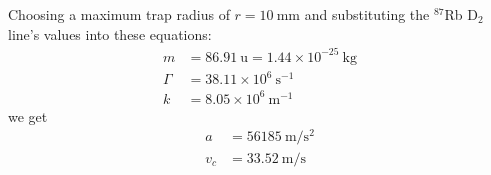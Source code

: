 \documentclass[12pt,a4paper]{article}
\begin{document}
Choosing a maximum trap radius of $r=10~\mathrm{mm}$ and substituting the $^{87}$Rb D$_2$ line's values into these equations:
\begin{align*}
m &= 86.91~\mathrm{u} = 1.44 \times 10^{-25}~\mathrm{kg} \\
\Gamma &= 38.11 \times 10^{6}~\mathrm{s}^{-1} \\
k &= 8.05 \times 10^{6}~\mathrm{m}^{-1}
\end{align*}
we get
\begin{align*}
a &= 56185~\mathrm{m}/\mathrm{s}^2 \\
v_c &= 33.52~\mathrm{m}/\mathrm{s}
\end{align*}



\end{document}
